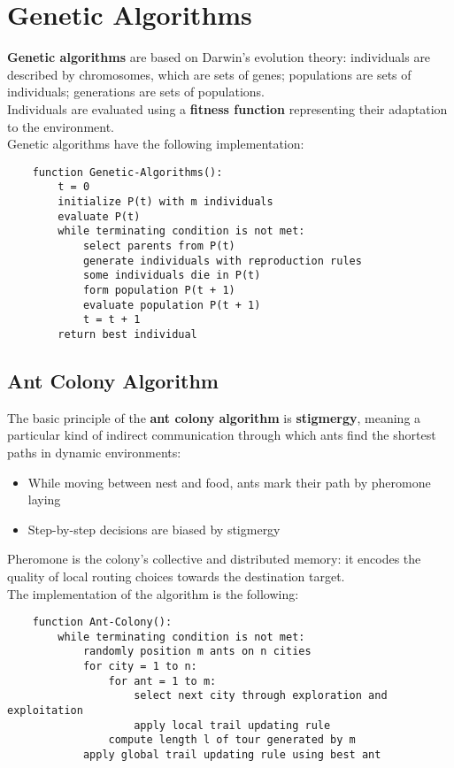 \documentclass{article}
\begin{document}
\newpage

\section{Genetic Algorithms}
\textbf{Genetic algorithms} are based on Darwin's evolution theory: individuals are described by chromosomes, which are sets of genes; populations are sets of individuals; generations are sets of populations. \\
Individuals are evaluated using a \textbf{fitness function} representing their adaptation to the environment. \\



Genetic algorithms have the following implementation:
\begin{verbatim}
    function Genetic-Algorithms():
        t = 0
        initialize P(t) with m individuals
        evaluate P(t)
        while terminating condition is not met:
            select parents from P(t)
            generate individuals with reproduction rules
            some individuals die in P(t)
            form population P(t + 1)
            evaluate population P(t + 1)
            t = t + 1
        return best individual
\end{verbatim}
\subsection{Ant Colony Algorithm}
The basic principle of the \textbf{ant colony algorithm} is \textbf{stigmergy}, meaning a particular kind of indirect communication through which ants find the shortest paths in dynamic environments:
\begin{itemize}
    \item While moving between nest and food, ants mark their path by pheromone laying
    \item Step-by-step decisions are biased by stigmergy
\end{itemize}
Pheromone is the colony’s collective and distributed memory: it encodes the quality of local routing choices towards the destination target. \\
The implementation of the algorithm is the following:
\begin{verbatim}
    function Ant-Colony():
        while terminating condition is not met:
            randomly position m ants on n cities
            for city = 1 to n:
                for ant = 1 to m:
                    select next city through exploration and exploitation
                    apply local trail updating rule
                compute length l of tour generated by m
            apply global trail updating rule using best ant
\end{verbatim}
\end{document}

